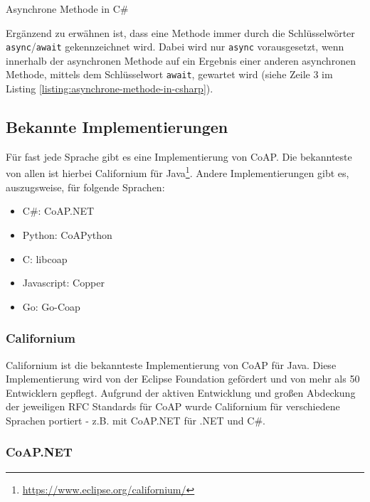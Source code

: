 \begin{listing}[H]
    \inputminted[framesep=2mm, baselinestretch=1.2, fontsize=\normalsize, linenos]{csharp}{codes/example_asynchronous.cs}
    \caption{Asynchrone Methode in C\#}
    \label{listing:asynchrone-methode-in-csharp}
\end{listing}

Ergänzend zu erwähnen ist, dass eine Methode immer durch die Schlüsselwörter \texttt{async}/\texttt{await} gekennzeichnet wird. Dabei wird nur \texttt{async} vorausgesetzt, wenn innerhalb der asynchronen Methode auf ein Ergebnis einer anderen asynchronen Methode, mittels dem Schlüsselwort \texttt{await}, gewartet wird (siehe Zeile 3 im Listing \ref{listing:asynchrone-methode-in-csharp}).

\subsection{Bekannte Implementierungen}
\label{subsec:bekannte-implementierungen}

Für fast jede Sprache gibt es eine Implementierung von CoAP. Die bekannteste von allen ist hierbei Californium für Java\footnote{\href{https://www.eclipse.org/californium/}{https://www.eclipse.org/californium/}}. Andere Implementierungen gibt es, auszugsweise, für folgende Sprachen:
\begin{itemize}
    \item C\#: CoAP.NET
    \item Python: CoAPython
    \item C: libcoap
    \item Javascript: Copper
    \item Go: Go-Coap
\end{itemize}

\subsubsection{Californium}
\label{subsubsec:californium}

Californium ist die bekannteste Implementierung von CoAP für Java. Diese Implementierung wird von der Eclipse Foundation gefördert und von mehr als 50 Entwicklern gepflegt. Aufgrund der aktiven Entwicklung und großen Abdeckung der jeweiligen RFC Standards für CoAP wurde Californium für verschiedene Sprachen portiert - z.B. mit CoAP.NET für .NET und C\#.

\subsubsection{CoAP.NET}
\label{subsubsec:coap-net}

